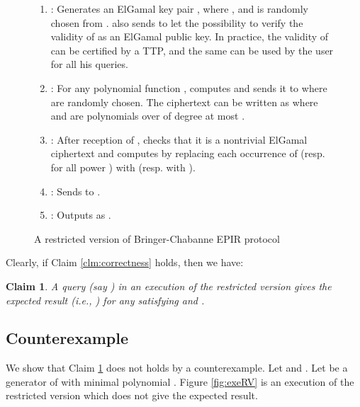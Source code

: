 \documentclass[JMC]{degruyter-journal}
\newtheorem{claim}{Claim}[section]
\begin{document}
\begin{figure}[ghp]
\begin{center}
\begin{boxedminipage}{12cm}
\begin{enumerate}
\itemsep=-0.1cm
\item :
Generates an ElGamal key pair , where , and  is randomly chosen from .
 also sends  to let  the possibility
to verify the validity of  as an ElGamal public key. In
practice, the validity of  can be certified by a TTP, and the
same  can be used by the user for all his queries.
\item : For any polynomial function ,
computes  and sends it to  where
  are randomly chosen. The ciphertext  can
be written as  where  and  are
polynomials over  of degree at most .
\item: After reception of  , checks that it is a  nontrivial
ElGamal ciphertext and computes  by replacing
each occurrence of  (resp.  for all power
) with  (resp. with ).
\item : Sends  to .
\item :  Outputs   as .
\end{enumerate}
\end{boxedminipage}
\end{center}
\caption{A restricted version of Bringer-Chabanne EPIR protocol}
\label{fig:RV}
\end{figure}



Clearly, if Claim \ref{clm:correctness} holds, then we have:
\begin{claim}\label{clm:correctness_restricted}
A query {\em (say )} in an execution of
the restricted version  gives
  the expected result {\em (i.e., )} for any  
 satisfying  and .
\end{claim}

\subsection{Counterexample}\label{sec:counterexample}
We show that Claim \ref{clm:correctness_restricted} does not holds
by a counterexample. Let 
and . Let  be a
generator of  with minimal polynomial . Figure \ref{fig:exeRV} is an  execution of
the restricted version  which does not give  the expected result.
\end{document}
